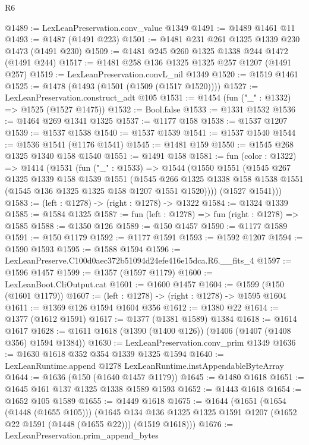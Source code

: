 \begin{lexlean}{R6}
\begin{coremodule}
@1489 := LexLeanPreservation.conv_value @1349
@1491 := @1489 @1461 @11
@1493 := @1487 (@1491 @223)
@1501 := @1481 @231 @261 @1325 @1339 @230 @1473 (@1491 @230)
@1509 := @1481 @245 @260 @1325 @1338 @244 @1472 (@1491 @244)
@1517 := @1481 @258 @136 @1325 @1325 @257 @1207 (@1491 @257)
@1519 := LexLeanPreservation.convL_nil @1349
@1520 := @1519 @1461
@1525 := @1478 (@1493 (@1501 (@1509 (@1517 @1520))))
@1527 := LexLeanPreservation.construct_adt @105
@1531 := @1454 (fun ("_" : @1332) => @1525 (@1527 @1475))
@1532 := Bool.false
@1533 := @1331 @1532
@1536 := @1464 @269 @1341 @1325
@1537 := @1177 @158
@1538 := @1537 @1207
@1539 := @1537 @1538
@1540 := @1537 @1539
@1541 := @1537 @1540
@1544 := @1536 @1541 (@1176 @1541)
@1545 := @1481 @159
@1550 := @1545 @268 @1325 @1340 @158 @1540
@1551 := @1491 @158
@1581 := fun (color : @1322) =>
  @1414
    (@1531
      (fun ("_" : @1533) =>
      @1544
        (@1550
          @1551
          (@1545
            @267
            @1325
            @1339
            @158
            @1539
            @1551
            (@1545
              @266
              @1325
              @1338
              @158
              @1538
              @1551
              (@1545 @136 @1325 @1325 @158 @1207 @1551 @1520))))
        (@1527 @1541)))
@1583 := (left : @1278) -> (right : @1278) -> @1322
@1584 := @1324 @1339
@1585 := @1584 @1325
@1587 := fun (left : @1278) => fun (right : @1278) => @1585
@1588 := @1350 @126
@1589 := @150 @1457
@1590 := @1177 @1589
@1591 := @150 @1179
@1592 := @1177 @1591
@1593 := @1592 @1207
@1594 := @1590 @1593
@1595 := @1588 @1594
@1596 := LexLeanPreserve.C100d0aec372b51094d24efe416e15dca.R6.__fits_4
@1597 := @1596 @1457
@1599 := @1357 (@1597 @1179)
@1600 := LexLeanBoot.CliOutput.cat
@1601 := @1600 @1457
@1604 := @1599 (@150 (@1601 @1179))
@1607 := (left : @1278) -> (right : @1278) -> @1595 @1604
@1611 := @1369 @126 @1594 @1604 @356
@1612 := @1380 @22
@1614 := @1377 (@1612 @1591)
@1617 := @1377 (@1381 @1589) @1384
@1618 := @1614 @1617
@1628 := @1611 @1618 (@1390 (@1400 @126)) (@1406 (@1407 (@1408 @356) @1594 @1384))
@1630 := LexLeanPreservation.conv_prim @1349
@1636 := @1630 @1618 @352 @354 @1339 @1325 @1594
@1640 := LexLeanRuntime.append @1278 LexLeanRuntime.instAppendableByteArray
@1644 := @1636 (@150 (@1640 @1457 @1179))
@1645 := @1480 @1618
@1651 := @1645 @161 @137 @1325 @1338 @1589 @1593
@1652 := @1443 @1618
@1654 := @1652 @105 @1589
@1655 := @1449 @1618
@1675 := @1644
    (@1651
      (@1654 (@1448 (@1655 @105)))
      (@1645 @134 @136 @1325 @1325 @1591 @1207 (@1652 @22 @1591 (@1448 (@1655 @22))) (@1519 @1618)))
@1676 := LexLeanPreservation.prim_append_bytes

\end{coremodule}
\end{lexlean}
